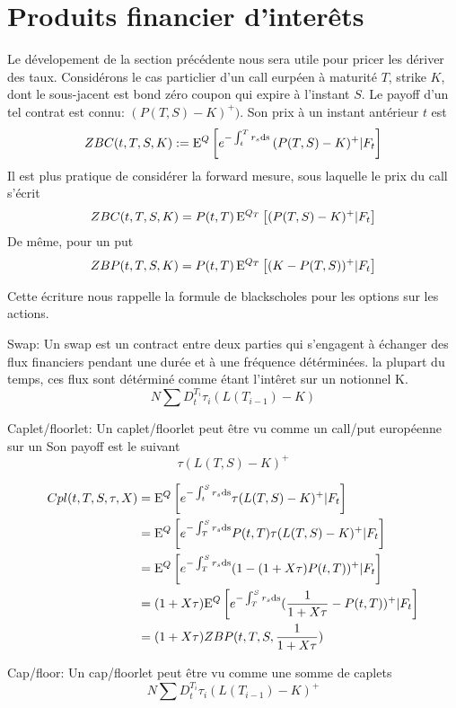 \section{Produits financier d'interêts}

Le dévelopement de la section précédente nous sera utile pour pricer les dériver des taux.
Considérons le cas particlier d'un call eurpéen à maturité $T$, strike $K$, dont le sous-jacent est bond zéro coupon qui expire à l'instant $S$. Le payoff d'un tel contrat est connu: $ (P(T, S) - K)^+)$. Son prix à un instant antérieur $t$ est
$$ZBC(t, T, S, K) := \mathrm{E}^Q \left[  e^{-\int_t^T r_s \rm{d}s} \, (P(T, S) - K)^+ | F_t  \right]$$
Il est plus pratique de considérer la forward mesure, sous laquelle le prix du call s'écrit
$$ZBC(t, T, S, K) = P(t, T) \, \mathrm{E}^{Q_T} \left[ (P(T, S) - K)^+ | F_t \right]$$
De même, pour un put
$$ZBP(t, T, S, K) = P(t, T) \, \mathrm{E}^{Q_T} \left[ (K - P(T, S))^+ | F_t \right]$$

Cette écriture nous rappelle la formule de blackscholes pour les options sur les actions.

\begin{defn}
  Swap:
Un swap est un contract entre deux parties qui s'engagent à échanger des flux financiers pendant une durée et à une fréquence détérminées. la plupart du temps, ces flux sont détérminé comme étant l'intêret sur un notionnel K. 
$$ N \sum D_t^{T_i} \tau_i (L(T_{i-1}) - K) $$
\end{defn}


\begin{defn}
  Caplet/floorlet:
  Un caplet/floorlet peut être vu comme un call/put européenne sur un
  Son payoff est le suivant
$$ \tau (L(T, S) - K)^+ $$
\end{defn}

\begin{align}
  Cpl(t, T, S, \tau, X)
  &= \mathrm{E}^Q \left[  e^{-\int_t^S r_s \rm{d}s} \tau (L(T, S) - K)^+ | F_t \right] \\ 
  &= \mathrm{E}^Q \left[  e^{-\int_T^S r_s \rm{d}s} P(t, T)  \tau (L(T, S) - K)^+ | F_t \right] \\
  &= \mathrm{E}^Q \left[  e^{-\int_T^S r_s \rm{d}s} (1 - (1 + X \tau)P(t, T))^+ | F_t \right] \\
  &= (1 + X \tau) \mathrm{E}^Q \left[  e^{-\int_T^S r_s \rm{d}s} (\frac{1}{1 + X \tau} - P(t, T))^+ | F_t \right] \\
  &= (1+X \tau) ZBP(t, T, S, \frac{1}{1+X \tau})
\end{align}

\begin{defn}
  Cap/floor:
Un cap/floorlet peut être vu comme une somme de caplets
$$ N \sum D_t^{T_i} \tau_i (L(T_{i-1}) - K)^+ $$
\end{defn}

